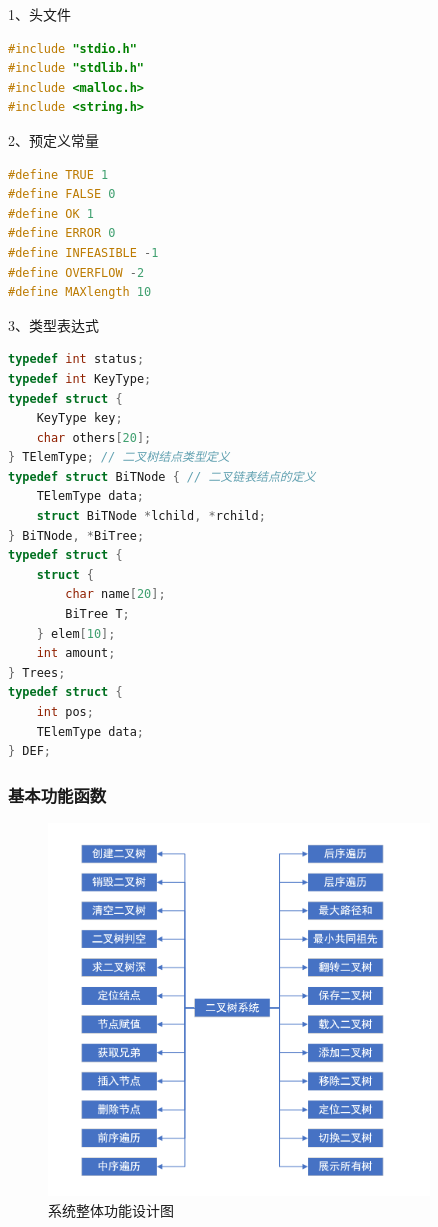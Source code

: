 \documentclass[supercite]{Experimental_Report}
\theoremstyle{definition}
\begin{document}
1、头文件

\begin{lstlisting}[language=c]
#include "stdio.h"
#include "stdlib.h"
#include <malloc.h>
#include <string.h>
\end{lstlisting}

2、预定义常量

\begin{lstlisting}[language=c]
#define TRUE 1
#define FALSE 0
#define OK 1
#define ERROR 0
#define INFEASIBLE -1
#define OVERFLOW -2
#define MAXlength 10

\end{lstlisting}

3、类型表达式

\begin{lstlisting}[language=c]
typedef int status;
typedef int KeyType;
typedef struct {
    KeyType key;
    char others[20];
} TElemType; // 二叉树结点类型定义
typedef struct BiTNode { // 二叉链表结点的定义
    TElemType data;
    struct BiTNode *lchild, *rchild;
} BiTNode, *BiTree;
typedef struct {
    struct {
        char name[20];
        BiTree T;
    } elem[10];
    int amount;
} Trees;
typedef struct {
    int pos;
    TElemType data;
} DEF;
\end{lstlisting}

\subsubsection{基本功能函数}

 \begin{figure}[H]
 	\centering
 	\includegraphics[width=0.9\textwidth]{images/二叉树系统.png}
 	\caption{系统整体功能设计图}
 	\label{txlab}
 \end{figure}
\end{document}
